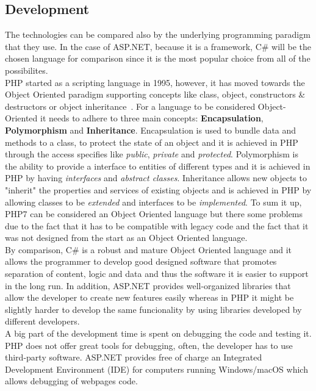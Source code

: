 \documentclass[11]{article}
\begin{document}
	\subsection{Development}
	The technologies can be compared also by the underlying programming paradigm that they use. In the case of ASP.NET, because it is a framework, C\# will be the chosen language for comparison since it is the most popular choice from all of the possibilites. \\
	
	\indent
	PHP started as a scripting language in 1995, however, it has moved towards the Object Oriented paradigm supporting concepts like class, object, constructors \& destructors or object inheritance~\citep{PhpOop}. For a language to be considered Object-Oriented it needs to adhere to three main concepts: \textbf{Encapsulation}, \textbf{Polymorphism} and \textbf{Inheritance}. Encapsulation is used to bundle data and methods to a class, to protect the state of an object and it is achieved in PHP through the access specifies like \textit{public}, \textit{private} and \textit{protected}. Polymorphism is the ability to provide a interface to entities of different types and it is achieved in PHP by having \textit{interfaces} and \textit{abstract classes}. Inheritance allows new objects to "inherit" the properties and services of existing objects and is achieved in PHP by allowing classes to be \textit{extended} and interfaces to be \textit{implemented}. To sum it up, PHP7 can be considered an Object Oriented language but there some problems due to the fact that it has to be compatible with legacy code and the fact that it was not designed from the start as an Object Oriented language.\\
	By comparison, C\# is a robust and mature Object Oriented language and it allows the programmer to develop good designed software that promotes separation of content, logic and data and thus the software it is easier to support in the long run. In addition, ASP.NET provides well-organized libraries that allow the developer to create new features easily  whereas in PHP it might be slightly harder to develop the same funcionality by using libraries developed by different developers. \\

	\indent
	A big part of the development time is spent on debugging the code and  testing it. PHP does not offer great tools for debugging, often, the developer has to use third-party software. ASP.NET provides free of charge an Integrated Development Environment (IDE) for computers running Windows/macOS which allows debugging of webpages code.\\
	
\end{document}
